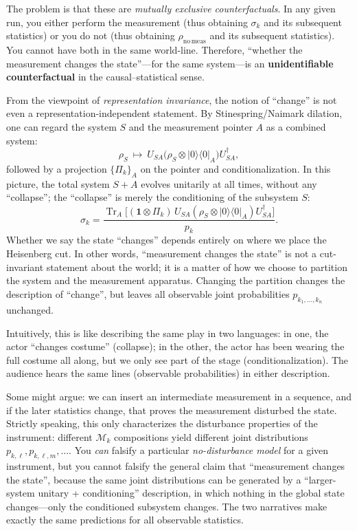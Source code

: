 \documentclass[12pt,a4paper]{article}
\begin{document}
	The problem is that these are \emph{mutually exclusive counterfactuals}. In any given run, you either perform the measurement (thus obtaining $\sigma_k$ and its subsequent statistics) or you do not (thus obtaining $\rho_{\mathrm{no\,meas}}$ and its subsequent statistics). You cannot have both in the same world-line. Therefore, ``whether the measurement changes the state''—for the same system—is an \textbf{unidentifiable counterfactual} in the causal–statistical sense.
	
	From the viewpoint of \emph{representation invariance}, the notion of ``change'' is not even a representation-independent statement. By Stinespring/Naimark dilation, one can regard the system $S$ and the measurement pointer $A$ as a combined system:
	\[
	\rho_S \ \longmapsto \ U_{SA} \big( \rho_S \otimes |0\rangle\!\langle 0|_A \big) U_{SA}^\dagger,
	\]
	followed by a projection $\{\Pi_k\}_A$ on the pointer and conditionalization. In this picture, the total system $S+A$ evolves unitarily at all times, without any ``collapse''; the ``collapse'' is merely the conditioning of the subsystem $S$:
	\[
	\sigma_k = \frac{\operatorname{Tr}_A\!\Big[ (\mathbf 1 \otimes \Pi_k) \, U_{SA} (\rho_S \otimes |0\rangle\!\langle 0|_A) U_{SA}^\dagger \Big]}{p_k}.
	\]
	Whether we say the state ``changes'' depends entirely on where we place the Heisenberg cut. In other words, ``measurement changes the state'' is not a cut-invariant statement about the world; it is a matter of how we choose to partition the system and the measurement apparatus. Changing the partition changes the description of ``change'', but leaves all observable joint probabilities $p_{k_1,\ldots,k_n}$ unchanged.
	
	Intuitively, this is like describing the same play in two languages: in one, the actor ``changes costume'' (collapse); in the other, the actor has been wearing the full costume all along, but we only see part of the stage (conditionalization). The audience hears the same lines (observable probabilities) in either description.
	
	Some might argue: we can insert an intermediate measurement in a sequence, and if the later statistics change, that proves the measurement disturbed the state. Strictly speaking, this only characterizes the disturbance properties of the instrument: different $\mathcal M_k$ compositions yield different joint distributions $p_{k,\ell}, p_{k,\ell,m}, \dots$. You \emph{can} falsify a particular \emph{no-disturbance model} for a given instrument, but you cannot falsify the general claim that ``measurement changes the state'', because the same joint distributions can be generated by a ``larger-system unitary + conditioning'' description, in which nothing in the global state changes—only the conditioned subsystem changes. The two narratives make exactly the same predictions for all observable statistics.
	
\end{document}
